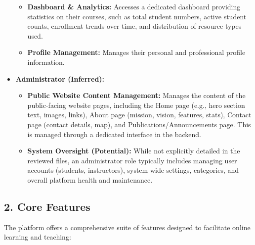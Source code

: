 \begin{itemize}
\begin{itemize}
        \item \textbf{Dashboard \& Analytics:} Accesses a dedicated dashboard providing statistics on their courses, such as total student numbers, active student counts, enrollment trends over time, and distribution of resource types used.
        \item \textbf{Profile Management:} Manages their personal and professional profile information.
    \end{itemize}
    \item \textbf{Administrator (Inferred):}
    \begin{itemize}
        \item \textbf{Public Website Content Management:} Manages the content of the public-facing website pages, including the Home page (e.g., hero section text, images, links), About page (mission, vision, features, stats), Contact page (contact details, map), and Publications/Announcements page. This is managed through a dedicated interface in the backend.
        \item \textbf{System Oversight (Potential):} While not explicitly detailed in the reviewed files, an administrator role typically includes managing user accounts (students, instructors), system-wide settings, categories, and overall platform health and maintenance.
    \end{itemize}
\end{itemize}

\subsection*{2. Core Features}

The platform offers a comprehensive suite of features designed to facilitate online learning and teaching:

